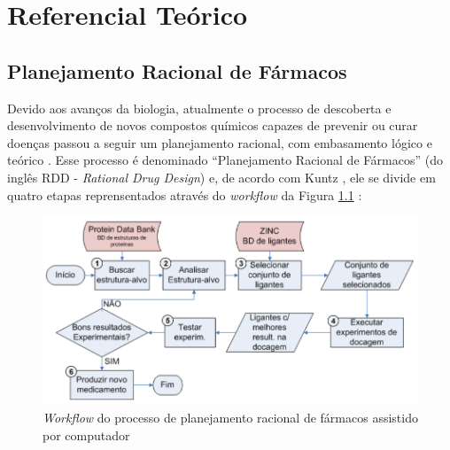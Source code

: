 \chapter{Referencial Teórico}

\section{Planejamento Racional de Fármacos}
Devido aos avanços da biologia, atualmente o processo de descoberta e desenvolvimento de novos compostos químicos capazes de prevenir ou curar doenças passou a seguir um planejamento racional, com embasamento lógico e teórico \cite{rdd}. Esse processo é denominado “Planejamento Racional de Fármacos” (do inglês RDD - \emph{Rational Drug Design}) e, de acordo com Kuntz \cite{kun92}, ele se divide em quatro etapas reprensentados através do \emph{workflow} da Figura \ref{fig:rddworkflow} \cite{kar11}: 

\begin{figure}[h]
	\center
	\includegraphics[width=14cm]{images/rdd_workflow.png}
	\caption{\emph{Workflow} do processo de planejamento racional de fármacos assistido por computador \cite{kar11}}
	\label{fig:rddworkflow}
\end{figure}



